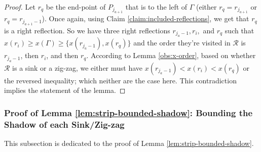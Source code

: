\documentclass[pdflatex,sn-mathphys-num]{sn-jnl}
\theoremstyle{thmstyleone}
\begin{document}
\begin{proof}
    Let $r_{q}$ be the end-point of $P_{j_{a+1}}$ that is to the left of $\Gamma$ (either $r_q = r_{j_{a+1}}$ or $r_q = r_{j_{a+1} - 1}$). Once again, using Claim \ref{claim:included-reflections}, we get that $r_{q}$ is a right reflection.
    So we have three right reflections $r_{j_a - 1}, r_{i},$ and $r_{q}$ such that $x(r_i) \ge x(\Gamma) \ge \{x(r_{j_a - 1}), x(r_q)\}$ and the order they're visited in $\mathcal R$ is $r_{j_a - 1}$, then $ r_i$, and then $r_q$. According to Lemma \ref{obs:x-order}, based on whether $\mathcal R$ is a sink or a zig-zag, we either must have $x(r_{j_a - 1}) < x(r_i) < x(r_q)$ or the reversed inequality; which neither are the case here. This contradiction implies the statement of the lemma.
\end{proof}

\subsubsection{Proof of Lemma \ref{lem:strip-bounded-shadow}: Bounding the Shadow of each Sink/Zig-zag}\label{sec:lemma-shadow-of-sink/zigzag}

This subsection is dedicated to the proof of Lemma \ref{lem:strip-bounded-shadow}. 
\end{document}
